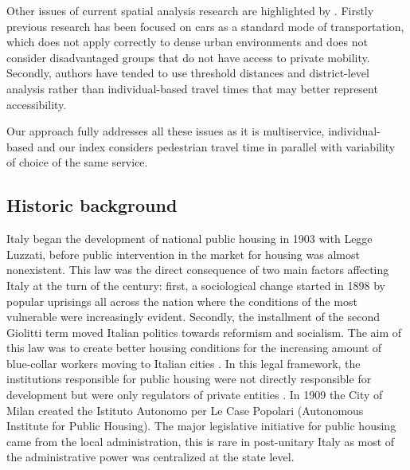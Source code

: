\documentclass[12pt]{article}
\begin{document}
Other issues of current spatial analysis research are highlighted by \cite{Li2021}. Firstly previous research has been focused on cars as a standard mode of transportation, which does not apply correctly to dense urban environments and does not consider disadvantaged groups that do not have access to private mobility. Secondly, authors have tended to use threshold distances and district-level analysis rather than individual-based travel times that may better represent accessibility.

Our approach fully addresses all these issues as it is multiservice, individual-based and our index considers pedestrian travel time in parallel with variability of choice of the same service.
 


\subsection{Historic background}
\label{hist_back}

Italy began the development of national public housing in 1903 with Legge Luzzati, before public intervention in the market for housing was almost nonexistent. This law was the direct consequence of two main factors affecting Italy at the turn of the century: first, a sociological change started in 1898 by popular uprisings all across the nation where the conditions of the most vulnerable were increasingly evident. Secondly, the installment of the second Giolitti term moved Italian politics towards reformism and socialism.  The aim of this law was to create better housing conditions for the increasing amount of blue-collar workers moving to Italian cities \parencite{istitutocasepopolari}. In this legal framework, the institutions responsible for public housing were not directly responsible for development but were only regulators of private entities \parencite{urbani}. In 1909 the City of Milan created the Istituto Autonomo per Le Case Popolari (Autonomous Institute for Public Housing). The major legislative initiative for public housing came from the local administration, this is rare in post-unitary Italy as most of the administrative power was centralized at the state level. 
\end{document}

